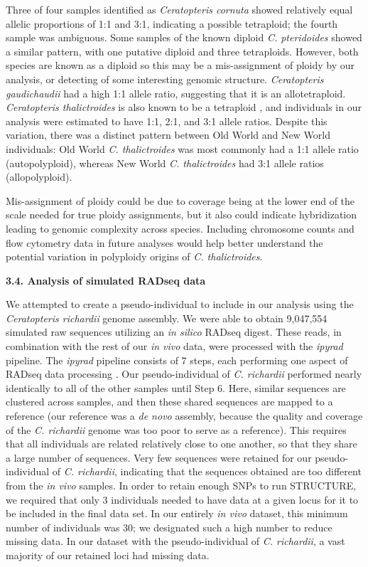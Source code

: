\documentclass[12pt]{article}
\begin{document}
\begin{flushleft}
Three of four samples identified as \textit{Ceratopteris cornuta} showed relatively equal allelic proportions of 1:1 and 3:1, indicating a possible tetraploid; the fourth sample was ambiguous. Some samples of the known diploid \textit{C. pteridoides} showed a similar pattern, with one putative diploid and three tetraploids. However, both species are known as a diploid so this may be a mis-assignment of ploidy by our analysis, or detecting of some interesting genomic structure. \textit{Ceratopteris gaudichaudii} had a high 1:1 allele ratio, suggesting that it is an allotetraploid. \textit{Ceratopteris thalictroides} is also known to be a tetraploid \autocite{LloydTax1974, Masuyama2010}, and individuals in our analysis were estimated to have 1:1, 2:1, and 3:1 allele ratios. Despite this variation, there was a distinct pattern between Old World and New World individuals: Old World \textit{C. thalictroides} was most commonly had a 1:1 allele ratio (autopolyploid), whereas New World \textit{C. thalictroides} had  3:1 allele ratios (allopolyploid). 

Mis-assignment of ploidy could be due to coverage being at the lower end of the scale needed for true ploidy assignments, but it also could indicate hybridization leading to genomic complexity across species. Including chromosome counts and flow cytometry data in future analyses would help better understand the potential variation in polyploidy origins of \textit{C. thalictroides}.

\textbf{3.4. Analysis of simulated RADseq data}

We attempted to create a pseudo-individual to include in our analysis using the \textit{Ceratopteris richardii} genome assembly. We were able to obtain 9,047,554 simulated raw sequences utilizing an \textit{in silico} RADseq digest. These reads, in combination with the rest of our \textit{in vivo} data, were processed with the \textit{ipyrad} pipeline. The \textit{ipyrad} pipeline consists of 7 steps, each performing one aspect of RADseq data processing \autocite{Eaton2020}. Our pseudo-individual of \textit{C. richardii} performed nearly identically to all of the other samples until Step 6. Here, similar sequences are clustered across samples, and then these shared sequences are mapped to a reference (our reference was a \textit{de novo} assembly, because the quality and coverage of the \textit{C. richardii} genome was too poor to serve as a reference). This requires that all individuals are related relatively close to one another, so that they share a large number of sequences. Very few sequences were retained for our pseudo-individual of \textit{C. richardii}, indicating that the sequences obtained are too different from the \textit{in vivo} samples. In order to retain enough SNPs to run STRUCTURE, we required that only 3 individuals needed to have data at a given locus for it to be included in the final data set. In our entirely \textit{in vivo} dataset, this minimum number of individuals was 30; we designated such a high number to reduce missing data. In our dataset with the pseudo-individual of \textit{C. richardii}, a vast majority of our retained loci had missing data.


\end{flushleft}
\end{document}
